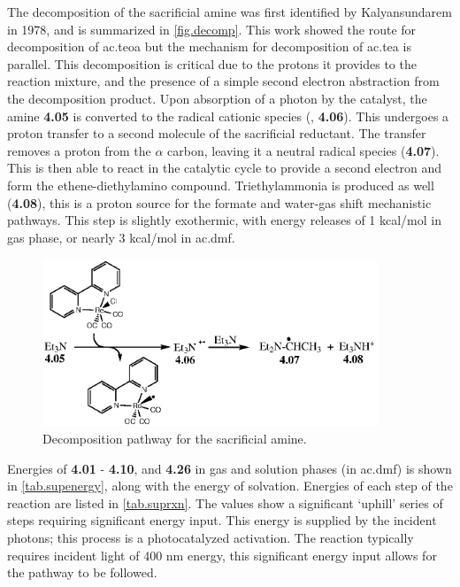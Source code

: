 The decomposition of the sacrificial amine was first identified by Kalyansundarem in 1978\autocite{kalyanasundaram1978}, and is summarized in \autoref{fig.decomp}. This work showed the route for decomposition of \gls{ac.teoa} but the mechanism for decomposition of \gls{ac.tea} is parallel. This decomposition is critical due to the protons it provides to the reaction mixture, and the presence of a simple second electron abstraction from the decomposition product. Upon absorption of a photon by the catalyst, the amine \textbf{4.05} is converted to the radical cationic species (, \textbf{4.06}). This undergoes a proton transfer to a second molecule of the sacrificial reductant. The transfer removes a proton from the $\alpha$ carbon, leaving it a neutral radical species (\textbf{4.07}). This is then able to react in the catalytic cycle to provide a second electron and form the ethene-diethylamino compound. Triethylammonia is produced as well (\textbf{4.08}), this is a proton source for the formate and water-gas shift mechanistic pathways. This step is slightly exothermic, with energy releases of 1 kcal/mol in gas phase, or nearly 3 kcal/mol in \gls{ac.dmf}.

\begin{figure}[!htb]
 \begin{center}
  \includegraphics[clip=true, width=100mm, keepaspectratio]{images/reddecomp.eps}
 \end{center}
\caption{Decomposition pathway for the sacrificial amine.}
\label{fig.decomp}
\end{figure} 

Energies of \textbf{4.01} - \textbf{4.10}, and \textbf{4.26} in gas and solution phases (in \gls{ac.dmf}) is shown in \autoref{tab.supenergy}, along with the energy of solvation. Energies of each step of the reaction are listed in \autoref{tab.suprxn}. The values show a significant `uphill' series of steps requiring significant energy input. This energy is supplied by the incident photons; this process is a photocatalyzed activation. The reaction typically requires incident light of 400 nm energy\autocite{hawecker1983}, this significant energy input allows for the pathway to be followed.

